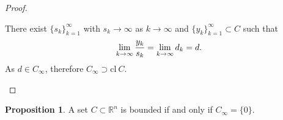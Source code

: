 \documentclass[a4paper,11pt, oneside]{book}
\theoremstyle{definition}
\newtheorem{prop}[dfn]{Proposition}
\begin{document}
\begin{proof}
\begin{enumerate}[label=\roman*,align=CenterWithParen]
\begin{enumerate}[label=iii-\alph*,align=CenterWithParen2]
      There exist $\{s_k\}_{k=1}^{\infty}$ with $s_k \rightarrow \infty$ as $k \rightarrow \infty$ and $\{y_k\}_{k=1}^{\infty} \subset C$ such that
      \begin{equation}
        \lim_{k \to \infty} \frac{y_k}{s_k} = \lim_{k \to \infty} d_k = d. \notag
      \end{equation}
      As $d \in C_{\infty}$, therefore $C_{\infty} \supset  \text{cl}\:C$.

    \end{enumerate}
  \end{enumerate}
\end{proof}

\begin{prop}
  A set $C \subset \mathbb{R}^n$ is bounded if and only if $C_\infty = \{0\}$.
\end{prop}
\end{document}
